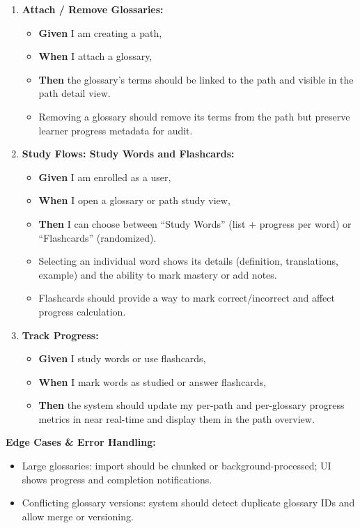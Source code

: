 \documentclass[12pt]{article}
\begin{document}
\begin{enumerate}
    \item \textbf{Attach / Remove Glossaries:}
    \begin{itemize}
        \item \textbf{Given} I am creating a path,
        \item \textbf{When} I attach a glossary,
        \item \textbf{Then} the glossary's terms should be linked to the path and visible in the path detail view.
        \item Removing a glossary should remove its terms from the path but preserve learner progress metadata for audit.
    \end{itemize}

    \item \textbf{Study Flows: Study Words and Flashcards:}
    \begin{itemize}
        \item \textbf{Given} I am enrolled as a user,
        \item \textbf{When} I open a glossary or path study view,
        \item \textbf{Then} I can choose between ``Study Words'' (list + progress per word) or ``Flashcards'' (randomized).
        \item Selecting an individual word shows its details (definition, translations, example) and the ability to mark mastery or add notes.
        \item Flashcards should provide a way to mark correct/incorrect and affect progress calculation.
    \end{itemize}

    \item \textbf{Track Progress:}
    \begin{itemize}
        \item \textbf{Given} I study words or use flashcards,
        \item \textbf{When} I mark words as studied or answer flashcards,
        \item \textbf{Then} the system should update my per-path and per-glossary progress metrics in near real-time and display them in the path overview.
    \end{itemize}
\end{enumerate}

\vspace{1em}
\textbf{Edge Cases \& Error Handling:}
\begin{itemize}
    \item Large glossaries: import should be chunked or background-processed; UI shows progress and completion notifications.
    \item Conflicting glossary versions: system should detect duplicate glossary IDs and allow merge or versioning.
\end{itemize}
\end{document}
